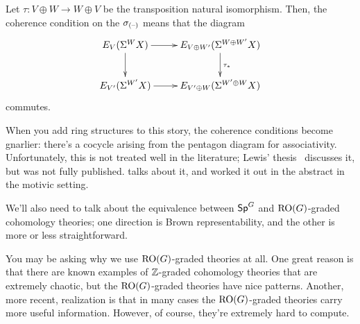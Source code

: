 Let $\tau\colon V\oplus W\to W\oplus V$ be the transposition natural isomorphism. Then, the coherence condition on
the $\sigma_{(\text{--})}$ means that the diagram
\[\xymatrix{
	E_V(\Sigma^W X)\ar[r]\ar[d] & E_{V\oplus W'}(\Sigma^{W\oplus W'}X)\ar[d]^{\tau_*}\\
	E_{V'}(\Sigma^{W'}X)\ar[r] & E_{V'\oplus W}(\Sigma^{W'\oplus W}X)
}\]
commutes.
\begin{rem}
When you add ring structures to this story, the coherence conditions become gnarlier: there's a cocycle arising
from the pentagon diagram for associativity. Unfortunately, this is not treated well in the literature; Lewis'
thesis~\cite{LewisThesis} discusses it, but was not fully published. \cite[Appendix A]{LewisMandell} talks about
it, and  worked it out in the abstract in the motivic setting.
\end{rem}
We'll also need to talk about the equivalence between $\mathsf{Sp}^G$ and $\mathrm{RO}(G)$-graded cohomology theories; one
direction is Brown representability, and the other is more or less straightforward.

You may be asking why we use $\mathrm{RO}(G)$-graded theories at all. One great reason is that there are known examples of
$\mathbb Z$-graded cohomology theories that are extremely chaotic, but the $\mathrm{RO}(G)$-graded theories have nice patterns.
Another, more recent, realization is that in many cases the $\mathrm{RO}(G)$-graded theories carry more useful information.
However, of course, they're extremely hard to compute.
